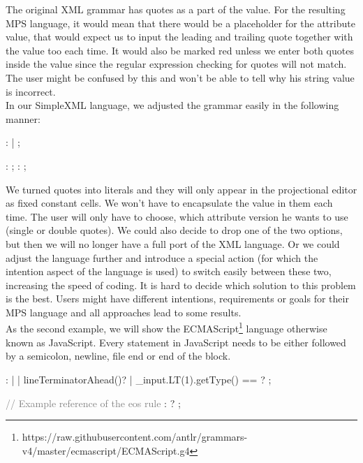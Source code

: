 The original XML grammar has quotes as a part of the value.
For the resulting MPS language, it would mean that there would be a placeholder for the attribute value, that would expect us to input the leading and trailing quote together with the value too each time.
It would also be marked red unless we enter both quotes inside the value since the regular expression checking for quotes will not match.
The user might be confused by this and won't be able to tell why his string value is incorrect.
\\

In our SimpleXML language, we adjusted the grammar easily in the following manner:

\begin{antlr}
	   :      
	            |      
	            ;

	       :   \regex{~["]*} ;
	       :   \regex{~[']*} ;
\end{antlr}

We turned quotes into literals and they will only appear in the projectional editor as fixed constant cells.
We won't have to encapsulate the value in them each time.
The user will only have to choose, which attribute version he wants to use (single or double quotes).
We could also decide to drop one of the two options, but then we will no longer have a full port of the XML language.
Or we could adjust the language further and introduce a special action (for which the intention aspect of the language is used) to switch easily between these two, increasing the speed of coding.
It is hard to decide which solution to this problem is the best.
Users might have different intentions, requirements or goals for their MPS language and all approaches lead to some results.
\\

As the second example, we will show the ECMAScript\footnote{https://raw.githubusercontent.com/antlr/grammars-v4/master/ecmascript/ECMAScript.g4} language otherwise known as JavaScript.
Every statement in JavaScript needs to be either followed by a semicolon, newline, file end or end of the block.

\begin{antlr}
	            : 
	               | 
	               | {lineTerminatorAhead()}?
	               | {{\_}input.LT(1).getType() == }?
	               ;
	    
	\textcolor{gray}{// Example reference of the eos rule}
	 :  ? 
	               ;
\end{antlr}

